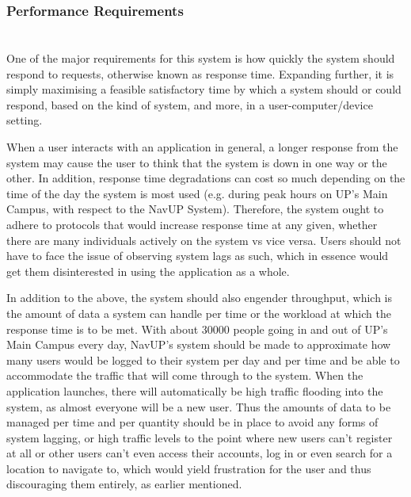 \subsubsection{Performance Requirements}

	\paragraph{}
	\mbox{}\\
	One of the major requirements for this system is how quickly the system should respond to requests, 
	otherwise known as response time. Expanding further, it is simply maximising a feasible satisfactory
	time by which a system should or could respond, based on the kind of system, and more, in a 
	user-computer/device setting. 

	When a user interacts with an application in general, a longer response from the system may cause 
	the user to think that the system is down in one way or the other. In addition, response time degradations 
	can cost so much depending on the time of the day the system is most used (e.g. during peak hours on UP’s 
	Main Campus, with respect to the NavUP System). 
	Therefore, the system ought to adhere to protocols that would increase response time at any given,
	whether there are many individuals actively on the system vs vice versa. Users should not have to 
	face the issue of observing system lags as such, which in essence would get them disinterested in
	using the application as a whole. 

	In addition to the above, the system should also engender throughput, which is the amount of data 
	a system can handle per time or the workload at which the response time is to be met. With about 
	30000 people going in and out of UP’s Main Campus every day, NavUP’s system should be made to approximate 
	how many users would  be logged to their system per day and per time and be able to accommodate the 
	traffic that will come through to the system. 
	When the application launches, there will automatically be high traffic flooding into the system, 
	as almost everyone will be a new user. Thus the amounts of data to be managed per time and per quantity 
	should be in place to avoid any forms of system lagging, or high traffic levels to the point where new users 
	can’t register at all or other users can’t even access their accounts, log in or even search for a location
	to navigate to, which would yield frustration for the user and thus discouraging them entirely,
	as earlier mentioned. 

